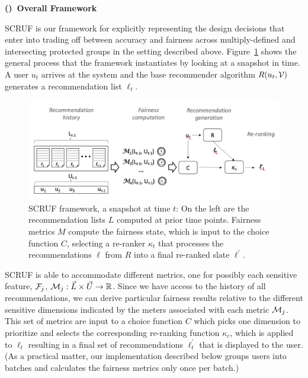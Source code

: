 \vspace{0.25cm}
\noindent \textbf{()~Overall Framework}
\vspace{0.25cm}

SCRUF is our framework for explicitly representing the design decisions that enter into trading off between accuracy and fairness across multiply-defined and intersecting protected groups in the setting described above. Figure~\ref{fig:framework} shows the general process that the framework instantiates by looking at a snapshot in time. A user $u_t$ arrives at the system and the base recommender algorithm $R(u_t,\mathcal{V})$ generates a recommendation list $\ell_t$. 

\begin{figure}[tb]
    \centering
    \includegraphics[width=5.5in]{imgs/dynfair/process-graphic.png}
    \caption{SCRUF framework, a snapshot at time $t$: On the left are the recommendation lists $L$ computed at prior time points. Fairness metrics $M$ compute the fairness state, which is input to the choice function $C$, selecting a re-ranker $\kappa_t$ that processes the recommendations $\ell$ from $R$ into a final re-ranked slate $\ell^{\prime}$.}
    \label{fig:framework}
\end{figure}

SCRUF is able to accommodate different metrics, one for possibly each sensitive feature, $\mathcal{F}_j$, $\mathcal{M}_j: \vec{L} \times \vec{U} \rightarrow \mathbb{R}$.  Since we have access to the history of all recommendations, we can derive particular fairness results relative to the different sensitive dimensions indicated by the meters associated with each metric $\mathcal{M}_j$. This set of metrics are input to a choice function $C$ which picks one dimension to prioritize and selects the corresponding re-ranking function $\kappa_c$, which is applied to $\ell_t$ resulting in a final set of recommendations $\ell^{\prime}_t$ that is displayed to the user. (As a practical matter, our implementation described below groups users into batches and calculates the fairness metrics only once per batch.)

